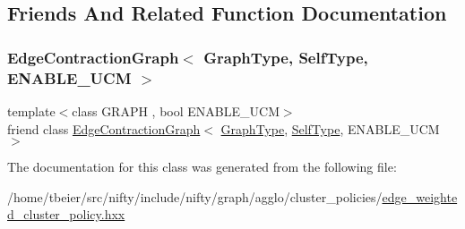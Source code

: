 \subsection{Friends And Related Function Documentation}
\mbox{\label{classnifty_1_1graph_1_1agglo_1_1EdgeWeightedClusterPolicy_a6939aa4c6113ba9c44fd5e048687ba92}} 
\subsubsection{\texorpdfstring{Edge\+Contraction\+Graph$<$ Graph\+Type, Self\+Type, E\+N\+A\+B\+L\+E\+\_\+\+U\+C\+M $>$}{EdgeContractionGraph< GraphType, SelfType, ENABLE\_UCM >}}
{\footnotesize\ttfamily template$<$class G\+R\+A\+PH , bool E\+N\+A\+B\+L\+E\+\_\+\+U\+CM$>$ \\
friend class \hyperlink{classnifty_1_1graph_1_1EdgeContractionGraph}{Edge\+Contraction\+Graph}$<$ \hyperlink{classnifty_1_1graph_1_1agglo_1_1EdgeWeightedClusterPolicy_a8e910f7b9d0c1baa1de7b6b1c3e58397}{Graph\+Type}, \hyperlink{classnifty_1_1graph_1_1agglo_1_1EdgeWeightedClusterPolicy}{Self\+Type}, E\+N\+A\+B\+L\+E\+\_\+\+U\+CM $>$\hspace{0.3cm}{\ttfamily [friend]}}



The documentation for this class was generated from the following file\+:\begin{DoxyCompactItemize}
\item 
/home/tbeier/src/nifty/include/nifty/graph/agglo/cluster\+\_\+policies/\hyperlink{edge__weighted__cluster__policy_8hxx}{edge\+\_\+weighted\+\_\+cluster\+\_\+policy.\+hxx}\end{DoxyCompactItemize}
